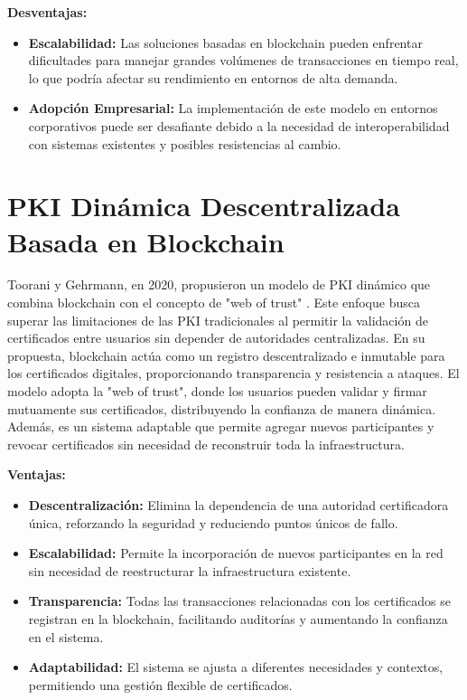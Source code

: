 \textbf{Desventajas:}

\begin{itemize}
  \item \textbf{Escalabilidad:} Las soluciones basadas en blockchain pueden enfrentar dificultades para manejar grandes volúmenes de transacciones en tiempo real, lo que podría afectar su rendimiento en entornos de alta demanda.
  \item \textbf{Adopción Empresarial:} La implementación de este modelo en entornos corporativos puede ser desafiante debido a la necesidad de interoperabilidad con sistemas existentes y posibles resistencias al cambio.
\end{itemize}

\section{PKI Dinámica Descentralizada Basada en Blockchain}

Toorani y Gehrmann, en 2020, propusieron un modelo de PKI dinámico que combina blockchain con el concepto de "web of trust" \cite{Toorani2020}. Este enfoque busca superar las limitaciones de las PKI tradicionales al permitir la validación de certificados entre usuarios sin depender de autoridades centralizadas. En su propuesta, blockchain actúa como un registro descentralizado e inmutable para los certificados digitales, proporcionando transparencia y resistencia a ataques. El modelo adopta la "web of trust", donde los usuarios pueden validar y firmar mutuamente sus certificados, distribuyendo la confianza de manera dinámica. Además, es un sistema adaptable que permite agregar nuevos participantes y revocar certificados sin necesidad de reconstruir toda la infraestructura.

\textbf{Ventajas:}

\begin{itemize}
  \item \textbf{Descentralización:} Elimina la dependencia de una autoridad certificadora única, reforzando la seguridad y reduciendo puntos únicos de fallo.
  \item \textbf{Escalabilidad:} Permite la incorporación de nuevos participantes en la red sin necesidad de reestructurar la infraestructura existente.
  \item \textbf{Transparencia:} Todas las transacciones relacionadas con los certificados se registran en la blockchain, facilitando auditorías y aumentando la confianza en el sistema.
  \item \textbf{Adaptabilidad:} El sistema se ajusta a diferentes necesidades y contextos, permitiendo una gestión flexible de certificados.
\end{itemize}

